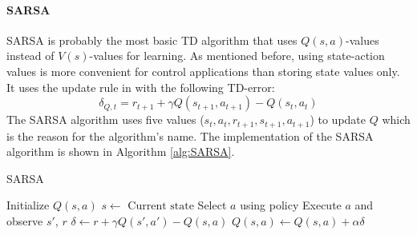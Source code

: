 
	
\paragraph{SARSA}\label{sec:RL-SARSA}
SARSA \cite{RummeryNiranjan:94} is probably the most basic \ac{TD} algorithm that uses $Q(s,a)$-values instead of $V(s)$-values for learning. As mentioned before, using state-action values is more convenient for control applications than storing state values only. It uses the update rule in  with the following TD-error:
$$
	\delta_{Q,t} =  r_{t+1} + \gamma Q(s_{t+1},a_{t+1}) - Q(s_t,a_t)
$$
The SARSA algorithm uses five values ($s_t,a_t,r_{t+1},s_{t+1},a_{t+1}$) to update $Q$ which is the reason for the algorithm's name. The implementation of the SARSA algorithm is shown in Algorithm \ref{alg:SARSA}.

\begin{algorithm}[ht]
	\caption{SARSA} \label{alg:SARSA}
	\begin{algorithmic}[1]
		\State Initialize $Q(s,a)$
			\State $s\gets \textrm{ Current state}$
			\State Select $a$ using policy
			\State Execute $a$ and observe $s'$, $r$
			\State $\delta \gets r + \gamma Q(s',a') - Q(s,a)$ 
			\State $Q(s,a) \gets Q(s,a) + \alpha \delta$ 
		\EndFor
	\end{algorithmic}
\end{algorithm}

